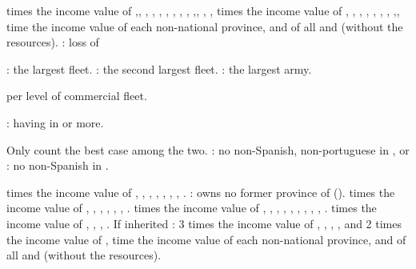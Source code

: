 \aparag[Territory.]
 times the income value of
,,
, , ,
, , ,
,
,, ,
, 
 times the income value of ,
, , ,
, , ,
,, 
 time the income value of each non-national province, and of
all \COL and \TP (without the resources).
 \VPs: loss of 

\aparag[Military.]
 \VPs: the largest fleet.
 \VPs: the second largest fleet.
 \VPs: the largest army.

\aparag[Trade.]
 \VP per level of commercial fleet.

\aparag[Diplomacy.]
 \VPs: having  in \AM or more.

\aparag[Colonisation.] Only count the best case among the two.
 \VPs: no non-Spanish, non-portuguese \COL in
, or
 \VPs: no non-Spanish \COL in .

\aparag[Territory.]
 times the income value of ,
, , ,
, , ,
.
 \VPs: \paysmajeurTurquie owns no former province of
\paysHongrie ().
 times the income value of ,
, , ,
, , .
 times the income value of ,
, , ,
, ,
, , ,
.
 times the income value of ,
, , .
\bparag If \paysmajeurAutriche inherited \regionBelgique: 3 times the
income value of , ,
, ,
 and 2 times the income value of
, 
 time the income value of each non-national province, and of
all \COL and \TP (without the resources).

